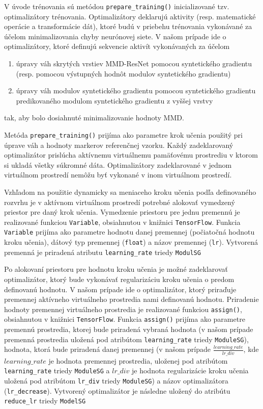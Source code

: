 V úvode trénovania sú metódou \texttt{prepare_training()} inicializované tzv. optimalizátory trénovania. Optimalizátory deklarujú aktivity (resp. matematické operácie a transformácie dát), ktoré budú v priebehu trénovania vykonávané za účelom minimalizovania chyby neurónovej siete. V našom prípade ide o optimalizátory, ktoré definujú sekvencie aktivít vykonávaných za účelom 
\begin{enumerate}
    \item úpravy váh skrytých vrstiev MMD-ResNet pomocou syntetického gradientu (resp. pomocou výstupných hodnôt modulov syntetického gradientu)
    \item úpravy váh modulov syntetického gradientu pomocou syntetického gradientu predikovaného modulom syntetického gradientu z vyššej vrstvy
\end{enumerate}
tak, aby bolo dosiahnuté minimalizovanie hodnoty MMD.

Metóda \texttt{prepare_training()} prijíma ako parametre krok učenia použitý pri úprave váh a hodnoty markerov referenčnej vzorku. Každý zadeklarovaný optimalizátor prislúcha aktívnemu virtuálnemu pamäťovému prostrediu v ktorom si ukladá všetky súkromné dáta. Optimalizátory zadeklarované v jednom virtuálnom prostredí nemôžu byť vykonané v inom virtuálnom prostredí.

Vzhľadom na použitie dynamicky sa meniaceho kroku učenia podľa definovaného rozvrhu je v aktívnom virtuálnom prostredí potrebné alokovať vymedzený priestor pre daný krok učenia. Vymedzenie priestoru pre jednu premennú je realizované funkciou \texttt{Variable}, obsiahnutou v knižnici \texttt{TensorFlow}. Funkcia \texttt{Variable} prijíma ako parametre hodnotu danej premennej (počiatočná hodnotu kroku učenia), dátový typ premennej (\texttt{float}) a názov premennej (\texttt{lr}). Vytvorená premenná je priradená atributu \texttt{learning_rate} triedy \texttt{ModulSG}

Po alokovaní priestoru pre hodnotu kroku učenia je možné zadeklarovať optimalizátor, ktorý bude vykonávať regularizáciu kroku učenia o predom definovanú hodnotu. V našom prípade ide o optimalizátor, ktorý priraďuje premennej aktívneho virtuálneho prostredia nami definovanú hodnotu. Priradenie hodnoty premennej virtuálneho prostredia je realizované funkciou \texttt{assign()}, obsiahnutou v knižnici \texttt{TensorFlow}. Funkcia \texttt{assign()} prijíma ako parametre premennú prostredia, ktorej bude priradená vybraná hodnota (v našom prípade premenná prostredia uložená pod atribútom \texttt{learning_rate} triedy \texttt{ModuleSG}), hodnota, ktorá bude priradená danej premennej (v našom prípade $\frac{learning\_rate}{lr\_div}$, kde $learning\_rate$ je hodnota premennej prostredia, uloženej pod atribútom \texttt{learning_rate} triedy \texttt{ModuleSG} a $lr\_div$ je hodnota regularizácie kroku učenia uložená pod atribútom \texttt{lr_div} triedy \texttt{ModuleSG}) a názov optimalizátora (\texttt{lr_decrease}). Vytvorený optimalizátor je následne uložený do atribútu \texttt{reduce_lr} triedy \texttt{ModelSG}

